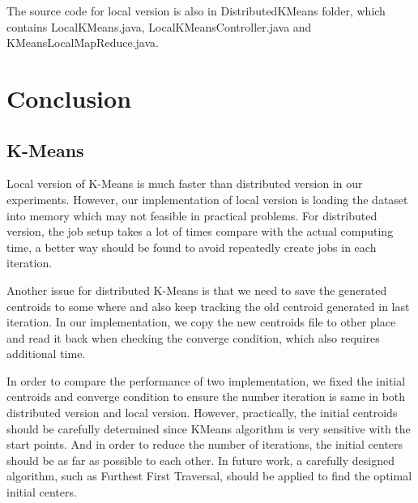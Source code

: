 \documentclass[11pt]{article} %
\begin{document}
The source code for local version is also in DistributedKMeans folder, which contains LocalKMeans.java, LocalKMeansController.java and KMeansLocalMapReduce.java.

\section{Conclusion}
\subsection{K-Means}
Local version of K-Means is much faster than distributed version in our experiments. However, our implementation of local version is loading the dataset into memory which may not feasible in practical problems. For distributed version, the job setup takes a lot of times compare with the actual computing time, a better way should be found to avoid repeatedly create jobs in each iteration.

Another issue for distributed K-Means is that we need to save the generated centroids to some where and also keep tracking the old centroid generated in last iteration. In our implementation, we copy the new centroids file to other place and read it back when checking the converge condition, which also requires additional time.

In order to compare the performance of two implementation, we fixed the initial centroids and converge condition to ensure the number iteration is same in both distributed version and local version. However, practically, the initial centroids should be carefully determined since KMeans algorithm is very sensitive with the start points. And in order to reduce the number of iterations, the initial centers should be as far as possible to each other. In future work, a carefully designed algorithm, such as Furthest First Traversal, should be applied to find the optimal initial centers.
\end{document}
